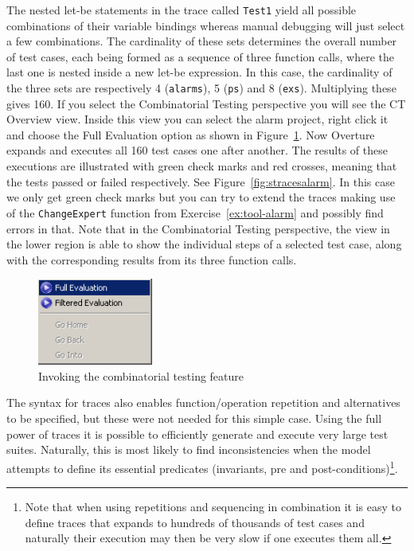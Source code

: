 \noindent The nested let-be statements in the trace called
\texttt{Test1} yield all possible combinations of their variable
bindings whereas manual debugging will just select a few combinations.
The cardinality of these sets determines the overall number of test
cases, each being formed as a sequence of three function calls, where
the last one is nested inside a new let-be expression. In this case,
the cardinality of the three sets are respectively 4
(\texttt{alarms}), 5 (\texttt{ps}) and 8 (\texttt{exs}). Multiplying
these gives 160. If you select the Combinatorial Testing perspective
you will see the \textsf{CT Overview} view. Inside this view you can
select the alarm project, right click it and choose the \textsf{Full
  Evaluation} option as shown in Figure~\ref{fig:CToptions}.  Now
Overture expands and executes all 160 test cases one after
another. The results of these executions are illustrated with green
check marks and red crosses, meaning that the tests passed or failed
respectively.  See Figure~\ref{fig:stracesalarm}. In this case we only
get green check marks but you can try to extend the traces making use
of the \texttt{ChangeExpert} function from
Exercise~\ref{ex:tool-alarm} and possibly find errors in that. Note
that in the Combinatorial Testing perspective, the view in the lower
region is able to show the individual steps of a selected test case,
along with the corresponding results from its three function calls.

\begin{figure}[htbp]
\begin{center}
\includegraphics[width=1.5in]{figures/CToptions}
\caption{Invoking the combinatorial testing feature\label{fig:CToptions}}
\end{center}
\end{figure}

The syntax for traces also enables function/operation repetition and alternatives to be
specified, but these were not needed for this simple case. Using the full power
of traces it is possible to efficiently generate and execute very large test
suites. Naturally, this is most likely to find inconsistencies when the model
attempts to define its essential predicates (invariants, pre and
post-conditions)\footnote{Note that when using repetitions and
  sequencing in combination it is easy to define traces that expands
  to hundreds of thousands of test cases and naturally their execution
  may then be very slow if one executes them all.}.

